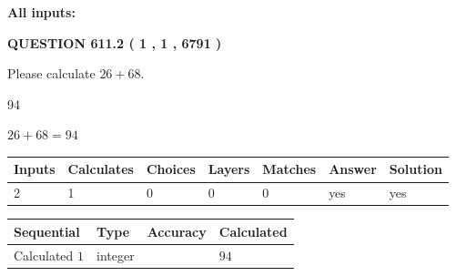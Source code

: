 \documentclass[12pt]{article}
\begin{document}
   
   
   
\noindent{}
   
   
   
   
\noindent\vspace{0.1in}\hspace{-0.08in} {\textbf{\Large{All inputs: }}}
   
   
  
\vspace{0.2in}
  
{\textbf{\Large{QUESTION
611.2 
 ( 1 , 1 , 6791 )
}}}
  
  
 
Please calculate $ %
26 +  %
68 $.
 
 
 
\noindent{}
 
 

94
 
 
\noindent{}
 
 

 
 
 
\noindent{}
 
 

$ %
26 +  %
68=   %
94$
 
 
\noindent{}
 
 

 
   
   
   
   
\noindent\begin{tabular}{|l|l|l|l|l|l|l|}
 \hline
Inputs & Calculates & Choices & Layers & Matches & Answer & Solution \\ \hline
 2  & 
 1  & 
 0
  & 
 0  & 
 0  & 
  yes & 
  yes 
  \\ \hline
 \end{tabular}
   
   
   
   
\noindent{}
   
   
  
  
\noindent\begin{tabular}{|l|l|l|l|}
\hline
 Sequential & Type & Accuracy & Calculated \\ 
\hline
 
 
  Calculated $  1 $ & integer &  & 
  $ 94 $ 
 \\  \hline  
 \end{tabular}
   
\end{document}
